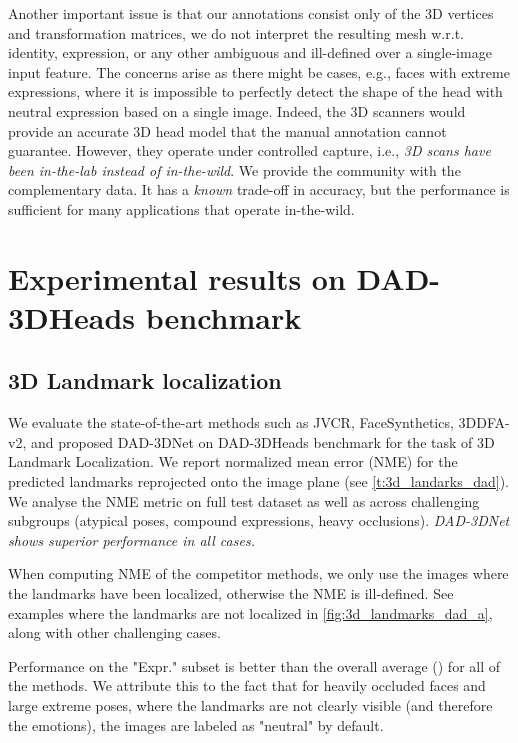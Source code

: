 \documentclass[10pt,twocolumn,letterpaper]{article}
\begin{document}
Another important issue is that our annotations consist only of the 3D vertices and transformation matrices, we do not interpret the resulting mesh w.r.t. identity, expression, or any other ambiguous and ill-defined over a single-image input feature.
The concerns arise as there might be cases, e.g., faces with extreme expressions, where it is impossible to perfectly detect the shape of the head with neutral expression based on a single image.
Indeed, the 3D scanners would provide an accurate 3D head model that the manual annotation cannot guarantee. 
However, they operate under controlled capture, i.e., \emph{3D scans have been in-the-lab instead of in-the-wild}. 
We provide the community with the complementary data. 
It has a \emph{known} trade-off in accuracy, but the performance is sufficient for many applications that operate in-the-wild.



\section{Experimental results on DAD-3DHeads benchmark}

\subsection{3D Landmark localization}

We evaluate the state-of-the-art methods such as JVCR\cite{jvcr}, FaceSynthetics\cite{wood2021fake}, 3DDFA-v2\cite{guo2020towards}, and proposed DAD-3DNet on DAD-3DHeads benchmark for the task of 3D Landmark Localization. We report normalized mean error (NME) for the predicted landmarks reprojected onto the image plane (see \cref{t:3d_landarks_dad}). 
We analyse the NME metric on full test dataset as well as across challenging subgroups (atypical poses, compound expressions, heavy occlusions). \emph{DAD-3DNet shows superior performance in all cases.}


When computing NME of the competitor methods, we only use the images where the landmarks have been localized, otherwise the NME is ill-defined. See examples where the landmarks are not localized in \cref{fig:3d_landmarks_dad_a}, along with other challenging cases.

Performance on the "Expr." subset is better than the overall average () for all of the methods. We attribute this to the fact that for heavily occluded faces and large extreme poses, where the landmarks are not clearly visible (and therefore the emotions), the images are labeled as "neutral" by default.
\end{document}

